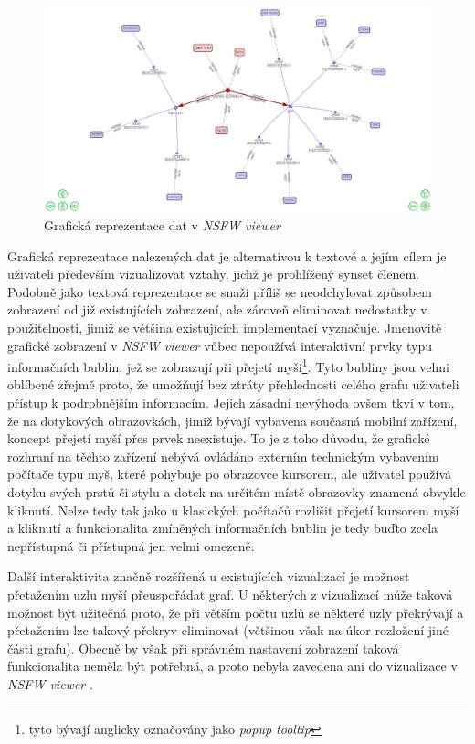 \documentclass[a4paper, 11pt, oneside]{book}
\newcommand{\simplywn}{\textit{NSFW viewer} }
\begin{document}
				\begin{figure}[h]
					\centering
					\includegraphics[width=1.0\textwidth]{simplywn_graph.png}
					\caption{Grafická reprezentace dat v \simplywn}
					\label{fig:simplywn_graph}
				\end{figure}

				Grafická reprezentace nalezených dat je alternativou k textové a jejím cílem je uživateli především vizualizovat vztahy, jichž je prohlížený synset členem. Podobně jako textová reprezentace se snaží příliš se neodchylovat způsobem zobrazení od již existujících zobrazení, ale zároveň eliminovat nedostatky v použitelnosti, jimiž se většina existujících implementací vyznačuje. Jmenovitě grafické zobrazení v \simplywn vůbec nepoužívá interaktivní prvky typu informačních bublin, jež se zobrazují při přejetí myší\footnote{tyto bývají anglicky označovány jako \textit{popup tooltip}}. Tyto bubliny jsou velmi oblíbené zřejmě proto, že umožňují bez ztráty přehlednosti celého grafu uživateli přístup k podrobnějším informacím. Jejich zásadní nevýhoda ovšem tkví v tom, že na dotykových obrazovkách, jimiž bývají vybavena současná mobilní zařízení, koncept přejetí myší přes prvek neexistuje. To je z toho důvodu, že grafické rozhraní na těchto zařízení nebývá ovládáno externím technickým vybavením počítače typu myš, které pohybuje po obrazovce kursorem, ale uživatel používá dotyku svých prstů či stylu a dotek na určitém místě obrazovky znamená obvykle kliknutí. Nelze tedy tak jako u klasických počítačů rozlišit přejetí kursorem myši a kliknutí a funkcionalita zmíněných informačních bublin je tedy buďto zcela nepřístupná či přístupná jen velmi omezeně. 

				Další interaktivita značně rozšířená u existujících vizualizací je možnost přetažením uzlu myší přeuspořádat graf. U některých z vizualizací může taková možnost být užitečná proto, že při větším počtu uzlů se některé uzly překrývají a přetažením lze takový překryv eliminovat (většinou však na úkor rozložení jiné části grafu). Obecně by však při správném nastavení zobrazení taková funkcionalita neměla být potřebná, a proto nebyla zavedena ani do vizualizace v \simplywn.  
\end{document}
